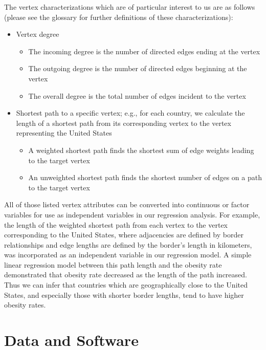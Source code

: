 \documentclass[oneside,12pt]{report}
\begin{document}
The vertex characterizations which are of particular interest to us are as follows (please see the glossary for further definitions of these characterizations):
\begin{itemize}
\item Vertex degree
\begin{itemize}
\item The incoming degree is the number of directed edges ending at the vertex
\item The outgoing degree is the number of directed edges beginning at the vertex
\item The overall degree is the total number of edges incident to the vertex
\end{itemize}
\item Shortest path to a specific vertex; e.g., for each country, we calculate the length of a shortest path from its corresponding vertex to the vertex representing the United States
\begin{itemize}
\item A weighted shortest path finds the shortest sum of edge weights leading to the target vertex
\item An unweighted shortest path finds the shortest number of edges on a path to the target vertex
\end{itemize}
\end{itemize}

All of those listed vertex attributes can be converted into continuous or factor variables for use as independent variables in our regression analysis. For example, the length of the weighted shortest path from each vertex to the vertex corresponding to the United States, where adjacencies are defined by border relationships and edge lengths are defined by the border's length in kilometers, was incorporated as an independent variable in our regression model. A simple linear regression model between this path length and the obesity rate demonstrated that obesity rate decreased as the length of the path increased. Thus we can infer that countries which are geographically close to the United States, and especially those with shorter border lengths, tend to have higher obesity rates.

\section*{Data and Software}
\end{document}
